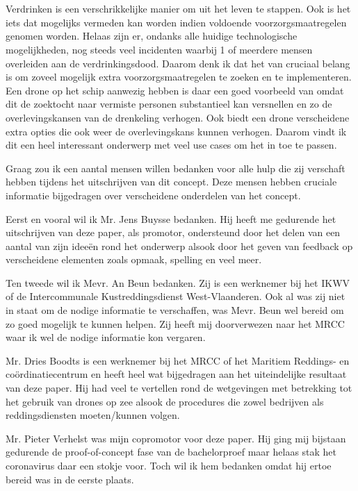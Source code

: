 
\chapter*{}
\label{ch:voorwoord}

Verdrinken is een verschrikkelijke manier om uit het leven te stappen. Ook is het iets dat mogelijks vermeden kan worden indien voldoende voorzorgsmaatregelen genomen worden. Helaas zijn er, ondanks alle huidige technologische mogelijkheden, nog steeds veel incidenten waarbij 1 of meerdere mensen overleiden aan de verdrinkingsdood. Daarom denk ik dat het van cruciaal belang is om zoveel mogelijk extra voorzorgsmaatregelen te zoeken en te implementeren. Een drone op het schip aanwezig hebben is daar een goed voorbeeld van omdat dit de zoektocht naar vermiste personen substantieel kan versnellen en zo de overlevingskansen van de drenkeling verhogen. Ook biedt een drone verscheidene extra opties die ook weer de overlevingskans kunnen verhogen. Daarom vindt ik dit een heel interessant onderwerp met veel use cases om het in toe te passen. 

Graag zou ik een aantal mensen willen bedanken voor alle hulp die zij verschaft hebben tijdens het uitschrijven van dit concept. Deze mensen hebben cruciale informatie bijgedragen over verscheidene onderdelen van het concept.

Eerst en vooral wil ik Mr. Jens Buysse bedanken. Hij heeft me gedurende het uitschrijven van deze paper, als promotor, ondersteund door het delen van een aantal van zijn ideeën rond het onderwerp alsook door het geven van feedback op verscheidene elementen zoals opmaak, spelling en veel meer.

Ten tweede wil ik Mevr. An Beun bedanken. Zij is een werknemer bij het IKWV of de Intercommunale Kustreddingsdienst West-Vlaanderen. Ook al was zij niet in staat om de nodige informatie te verschaffen, was Mevr. Beun wel bereid om zo goed mogelijk te kunnen helpen. Zij heeft mij doorverwezen naar het MRCC waar ik wel de nodige informatie kon vergaren.

Mr. Dries Boodts is een werknemer bij het MRCC of het Maritiem Reddings- en coördinatiecentrum en heeft heel wat bijgedragen aan het uiteindelijke resultaat van deze paper. Hij had veel te vertellen rond de wetgevingen met betrekking tot het gebruik van drones op zee alsook de procedures die zowel bedrijven als reddingsdiensten moeten/kunnen volgen. 

Mr. Pieter Verhelst was mijn copromotor voor deze paper. Hij ging mij bijstaan gedurende de proof-of-concept fase van de bachelorproef maar helaas stak het coronavirus daar een stokje voor. Toch wil ik hem bedanken omdat hij ertoe bereid was in de eerste plaats.  


